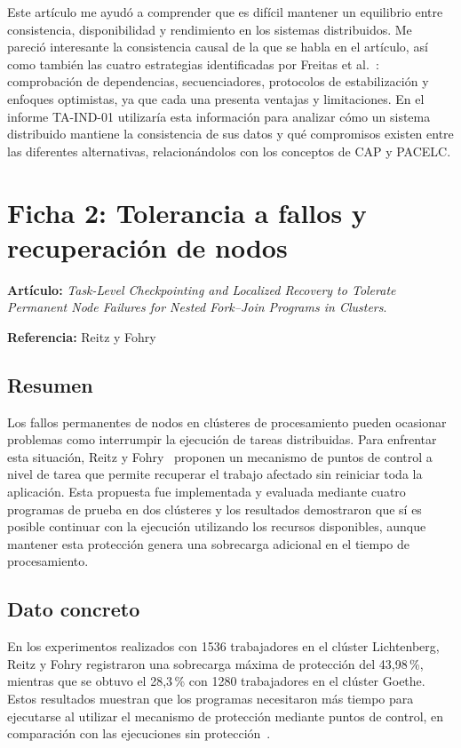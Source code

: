 \documentclass[12pt,a4paper]{article}
\begin{document}
Este artículo me ayudó a comprender que es difícil mantener un equilibrio entre consistencia, disponibilidad y rendimiento en los sistemas distribuidos. Me pareció interesante la consistencia causal de la que se habla en el artículo, así como también las cuatro estrategias identificadas por Freitas et al.~\cite{freitas2025}: comprobación de dependencias, secuenciadores, protocolos de estabilización y enfoques optimistas, ya que cada una presenta ventajas y limitaciones. En el informe TA-IND-01 utilizaría esta información para analizar cómo un sistema distribuido mantiene la consistencia de sus datos y qué compromisos existen entre las diferentes alternativas, relacionándolos con los conceptos de CAP y PACELC.

\section*{Ficha 2: Tolerancia a fallos y recuperación de nodos}

\noindent\textbf{Artículo:} \textit{Task-Level Checkpointing and Localized Recovery to Tolerate Permanent Node Failures for Nested Fork--Join Programs in Clusters}.

\noindent\textbf{Referencia:} Reitz y Fohry~\cite{reitz2024}

\subsection*{Resumen}

Los fallos permanentes de nodos en clústeres de procesamiento pueden ocasionar problemas como interrumpir la ejecución de tareas distribuidas. Para enfrentar esta situación, Reitz y Fohry~\cite{reitz2024} proponen un mecanismo de puntos de control a nivel de tarea que permite recuperar el trabajo afectado sin reiniciar toda la aplicación. Esta propuesta fue implementada y evaluada mediante cuatro programas de prueba en dos clústeres y los resultados demostraron que sí es posible continuar con la ejecución utilizando los recursos disponibles, aunque mantener esta protección genera una sobrecarga adicional en el tiempo de procesamiento.

\subsection*{Dato concreto}

En los experimentos realizados con 1536 trabajadores en el clúster Lichtenberg, Reitz y Fohry registraron una sobrecarga máxima de protección del 43,98\,\%, mientras que se obtuvo el 28,3\,\% con 1280 trabajadores en el clúster Goethe. Estos resultados muestran que los programas necesitaron más tiempo para ejecutarse al utilizar el mecanismo de protección mediante puntos de control, en comparación con las ejecuciones sin protección~\cite{reitz2024}.
\end{document}
